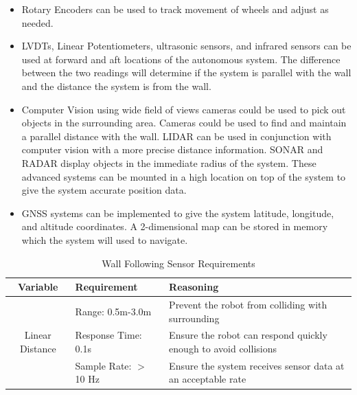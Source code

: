 \documentclass[12pt]{article}
\begin{document}
\begin{itemize}
\setlength\itemsep{-0.5em}
\item Rotary Encoders can be used to track movement of wheels and adjust as needed.
\item LVDTs, Linear Potentiometers, ultrasonic sensors, and infrared sensors can be used at forward and aft locations of the autonomous system. The difference between the two readings will determine if the system is parallel with the wall and the distance the system is from the wall.
\item
Computer Vision using wide field of views cameras could be used to pick out objects in the surrounding area. Cameras could be used to find and maintain a parallel distance with the wall. LIDAR can be used in conjunction with computer vision with a more precise distance information. SONAR and RADAR display objects in the immediate radius of the system. These advanced systems can be mounted in a high location on top of the system to give the system accurate position data.
\item
GNSS systems can be implemented to give the system latitude, longitude, and altitude coordinates. A 2-dimensional map can be stored in memory which the system will used to navigate.
\end{itemize}


\vspace*{-\baselineskip}
\begin{table}[htbp]
  \centering
  \caption{Wall Following Sensor Requirements}
    \begin{tabular}{c|p{10em}|p{29.72em}}
    \multicolumn{1}{p{6.9em}|}{\textbf{Variable}} & \textbf{Requirement} & \textbf{Reasoning} \bigstrut[b]\\
\hline
    \multicolumn{1}{c|}{\multirow{3}[1]{*}{Linear Distance}} & Range: 0.5m-3.0m & Prevent the robot from colliding with surrounding \bigstrut[t]\\
          & Response Time: 0.1s & \multicolumn{1}{l}{Ensure the robot can respond quickly enough to avoid collisions } \\
          & Sample Rate: $>$ 10 Hz & Ensure the system receives sensor data at an acceptable rate \\
    \end{tabular}%
  \label{tab:addlabel}%
\end{table}%
\end{document}
